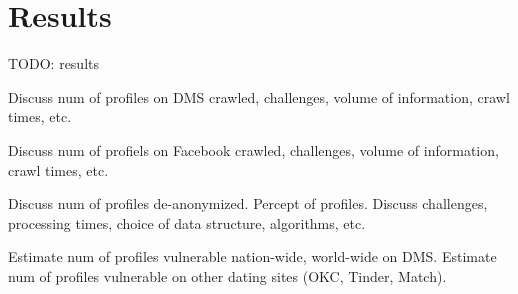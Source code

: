 \section{Results}
\label{sec:results}

TODO: results

Discuss num of profiles on DMS crawled, challenges, volume of information, crawl times, etc.

Discuss num of profiels on Facebook crawled, challenges, volume of information, crawl times, etc.

Discuss num of profiles de-anonymized. Percept of profiles. 
Discuss challenges, processing times, choice of data structure, algorithms, etc.

Estimate num of profiles vulnerable nation-wide, world-wide on DMS.
Estimate num of profiles vulnerable on other dating sites (OKC, Tinder, Match).
